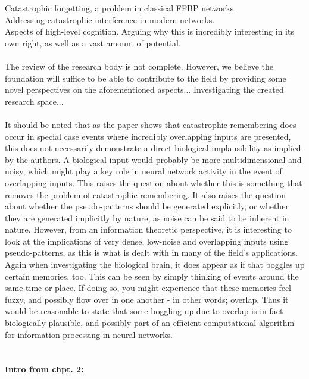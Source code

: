 Catastrophic forgetting, a problem in classical FFBP networks.
\\
Addressing catastrophic interference in modern networks.
\\
Aspects of high-level cognition. Arguing why this is incredibly interesting in its own right, as well as a vast amount of potential.
\\\\
The review of the research body is not complete. However, we believe the foundation will suffice to be able to contribute to the field by providing some novel perspectives on the aforementioned aspects... Investigating the created research space...
\\\\
It should be noted that as the paper shows that catastrophic remembering does occur in special case events where incredibly overlapping inputs are presented, this does not necessarily demonstrate a direct biological implausibility as implied by the authors. A biological input would probably be more multidimensional and noisy, which might play a key role in neural network activity in the event of overlapping inputs. This raises the question about whether this is something that removes the problem of catastrophic remembering. It also raises the question about whether the pseudo-patterns should be generated explicitly, or whether they are generated implicitly by nature, as noise can be said to be inherent in nature. However, from an information theoretic perspective, it is interesting to look at the implications of very dense, low-noise and overlapping inputs using pseudo-patterns, as this is what is dealt with in many of the field's applications. Again when investigating the biological brain, it does appear as if that boggles up certain memories, too. This can be seen by simply thinking of events around the same time or place. If doing so, you might experience that these memories feel fuzzy, and possibly flow over in one another - in other words; overlap. Thus it would be reasonable to state that some boggling up due to overlap is in fact biologically plausible, and possibly part of an efficient computational algorithm for information processing in neural networks.
\\\\\\
\textbf{Intro from chpt. 2:}

